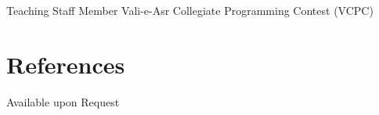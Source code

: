 \documentclass[10pt,a4paper,sans]{moderncv}        %
\begin{document}
  {Teaching Staff Member}
  {Vali-e-Asr Collegiate Programming Contest (VCPC)}
  {}
  {}
  {}
  

\section{References}

Available upon Request







\end{document}

